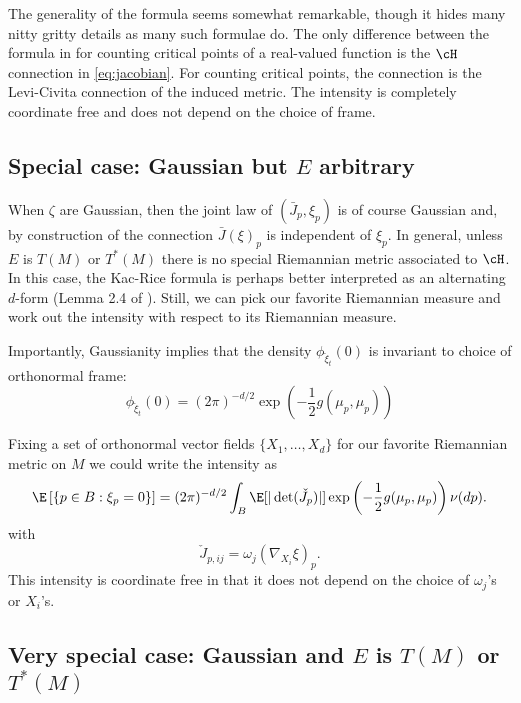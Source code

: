 \documentclass{article}
\begin{document}
The generality of the formula seems somewhat remarkable, though it hides many
nitty gritty details as many such formulae do. The only difference between the formula in
\cite{RFG} for counting critical points of a real-valued function is the $\cH$ connection in
\eqref{eq:jacobian}. For counting
critical points, the connection is the Levi-Civita connection of the induced metric. The intensity
is completely coordinate free and does not depend on the choice of frame.

\subsection{Special case: Gaussian but $E$ arbitrary}

When $\zeta$ are Gaussian, then the joint law of $(\bar{J}_p,\xi_p)$ is of course Gaussian and, by construction of
the connection
$\bar{J}(\xi)_p$ is independent of $\xi_p$. In general, unless $E$ is $T(M)$ or $T^*(M)$ there is no
special Riemannian metric associated to $\cH$. In this case, the Kac-Rice formula is perhaps better interpreted
as an alternating $d$-form (Lemma 2.4 of \cite{EulerCharManifolds}).
Still, we can pick our favorite Riemannian measure and work out the intensity
with respect to its Riemannian measure.

Importantly, Gaussianity implies that
the density $\phi_{\breve{\xi}_t}(0)$ is invariant to choice of orthonormal frame:
$$
\phi_{\breve{\xi}_t}(0) = (2\pi)^{-d/2} \exp\left(-\frac{1}{2} g(\mu_p, \mu_p) \right)
$$

Fixing a set of orthonormal vector fields $\{X_1,\dots, X_d\}$ for our favorite Riemannian metric on $M$ we could
write the intensity as
$$
\begin{aligned}
\E \left[\{p \in B: \xi_p=0\} \right] &= (2 \pi)^{-d/2}\int_{B} \E[|\det(\check{J}_p)|]  \exp\left(-\frac{1}{2} g(\mu_{p}, \mu_{p}) \right) \nu(dp). \\
\end{aligned}
$$
with
$$
\check{J}_{p,ij} =  \omega_j(\nabla_{X_i}\xi)_{p}.
$$
This intensity is coordinate free in that it does not depend on the choice of $\omega_j$'s or $X_i$'s.

\subsection{Very special case: Gaussian and $E$ is $T(M)$ or $T^*(M)$}
\end{document}
